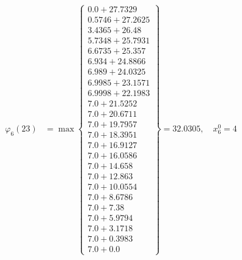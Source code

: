 \documentclass{article}
\begin{document}
\begin{align*}
  
  
  
\varphi_{6}(23) &= \max \left\{ \begin{array}{c}
0.0 + 27.7329 \\
 0.5746 + 27.2625 \\
 3.4365 + 26.48 \\
 5.7348 + 25.7931 \\
 6.6735 + 25.357 \\
 6.934 + 24.8866 \\
 6.989 + 24.0325 \\
 6.9985 + 23.1571 \\
 6.9998 + 22.1983 \\
 7.0 + 21.5252 \\
 7.0 + 20.6711 \\
 7.0 + 19.7957 \\
 7.0 + 18.3951 \\
 7.0 + 16.9127 \\
 7.0 + 16.0586 \\
 7.0 + 14.658 \\
 7.0 + 12.863 \\
 7.0 + 10.0554 \\
 7.0 + 8.6786 \\
 7.0 + 7.38 \\
 7.0 + 5.9794 \\
 7.0 + 3.1718 \\
 7.0 + 0.3983 \\
 7.0 + 0.0
\end{array} \right\}=32.0305,\quad x_{6}^0=4\\
  
  
  

\end{align*}
\end{document}
